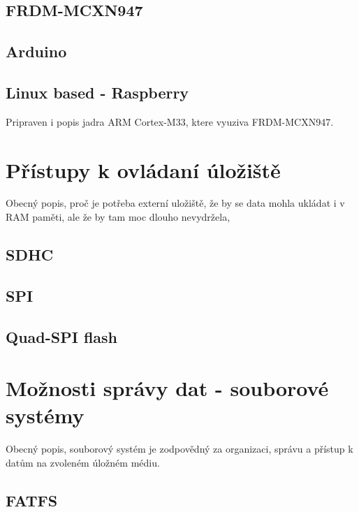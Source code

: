 \subsection{FRDM-MCXN947}

\subsection{Arduino}

\subsection{Linux based - Raspberry}

Pripraven i popis jadra ARM Cortex-M33, ktere vyuziva FRDM-MCXN947.

\section{Přístupy k ovládaní úložiště}
Obecný popis, proč je potřeba externí uložiště, že by se data mohla ukládat i v RAM paměti, ale že by tam moc dlouho nevydržela, 

\subsection{SDHC}

\subsection{SPI}
\subsection{Quad-SPI flash}


\section{Možnosti správy dat - souborové systémy} 
Obecný popis, souborový systém je zodpovědný za organizaci, správu a přístup k datům na zvoleném úložném médiu.

\subsection{FATFS}

